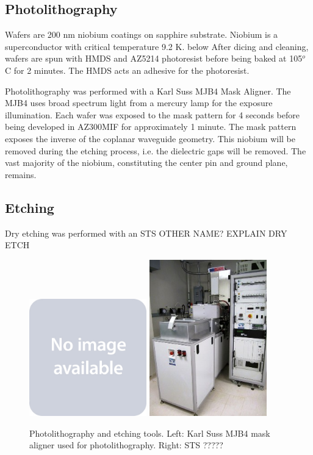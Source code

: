 \documentclass[11 pt, oneside]{book} %
\begin{document}
\subsection{Photolithography}
Wafers are 200 nm niobium coatings on sapphire substrate. Niobium is a superconductor with critical temperature 9.2 K.  below After dicing and cleaning, wafers are spun with HMDS and AZ5214 photoresist before being baked at 105$^o$ C for 2 minutes. The HMDS acts an adhesive for the photoresist. 

Photolithography was performed with a Karl Suss MJB4 Mask Aligner. The MJB4 uses broad spectrum light from a mercury lamp for the exposure illumination. Each wafer was exposed to the mask pattern for 4 seconds before being developed in AZ300MIF for approximately 1 minute. The mask pattern exposes the inverse of the coplanar waveguide geometry. This niobium will be removed during the etching process, i.e. the dielectric gaps will be removed. The vast majority of the niobium, constituting the center pin and ground plane, remains. 

\subsection{Etching}
Dry etching was performed with an STS OTHER NAME? EXPLAIN DRY ETCH

\begin{figure}[h] 
   \centering
   \includegraphics[width=2in]{placeholder.jpg} \includegraphics[width=2in]{STS.jpg} 
   \caption[Photolithography and etching tools]{Photolithography and etching tools. Left: Karl Suss MJB4 mask aligner used for photolithography. Right: STS ?????}
   \label{fig:Wirebonding}
\end{figure}
\end{document}
